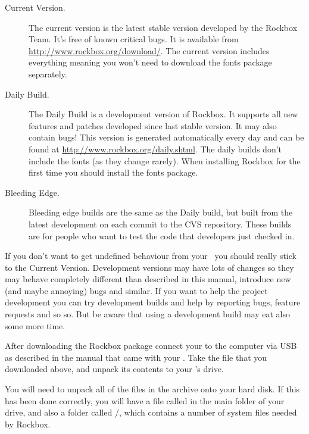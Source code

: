 \begin{description}
\item[Current Version.] The current version is the latest stable version
  developed by the Rockbox Team. It's free of known critical bugs.  It is
  available from \url{http://www.rockbox.org/download/}. The current version
  includes everything meaning you won't need to download the fonts package
  separately.
  
\item[Daily Build.] The Daily Build is a development version of Rockbox. It
  supports all new features and patches developed since last stable version. It
  may also contain bugs! This version is generated automatically every day
  and can be found at \url{http://www.rockbox.org/daily.shtml}.
  The daily builds don't include the fonts (as they change rarely).
  When installing Rockbox for the first time you should install the fonts
  package.
  
\item[Bleeding Edge.] Bleeding edge builds are the same as the Daily build, 
  but built from the latest development on each commit to the CVS repository.
  These builds are for people who want to test the code that developers just
  checked in.
\end{description}

If you don't want to get undefined behaviour from your \dap\ you should
really stick to the Current Version. Development versions may have lots of
changes so they may behave completely different than described in this manual,
introduce new (and maybe annoying) bugs and similar. If you want to help the
project development you can try development builds and help by reporting bugs,
feature requests and so so. But be aware that using a development build may
eat also some more time.

After downloading the Rockbox package connect your \dap{} to the 
computer via USB as described in the manual that came with your \dap{}.
Take the file that you downloaded above, and unpack
its contents to your \playerman{}'s drive.

You will need to unpack all of the files in the archive onto your hard disk. 
If this has been done correctly, you will have a file called 
\fname{\firmwarefilename} in the main folder of your \daps{} drive, and 
also a folder called /, which contains a number of system 
files needed by Rockbox.

